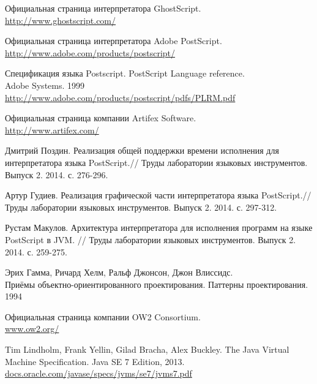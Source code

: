 \documentclass[14pt]{extarticle}
\begin{document}
	\begin{thebibliography}{99}
		Официальная страница интерпретатора GhostScript. \\
		\url{http://www.ghostscript.com/}
		
		Официальная страница интерпретатора Adobe PostScript. \\
		\url{http://www.adobe.com/products/postscript/}
		
		Спецификация языка Postscript. PostScript Language reference. \\
		Adobe Systems. 1999\\
		\url{http://www.adobe.com/products/postscript/pdfs/PLRM.pdf}
		
		Официальная страница компании Artifex Software. \\
		\url{	http://www.artifex.com/}

		Дмитрий Поздин. Реализация общей поддержки времени исполнения для интерпретатора языка PostScript.// Труды лаборатории языковых инструментов. Выпуск 2. 2014. с. 276-296.
		
		Артур Гудиев.
		Реализация графической части интерпретатора языка PostScript.// Труды лаборатории языковых инструментов. Выпуск 2. 2014. с. 297-312.

		Рустам Макулов.
		Архитектура интерпретатора для исполнения программ на языке PostScript в JVM. // Труды лаборатории языковых инструментов. Выпуск 2. 2014. с. 259-275.
		
		
		Эрих Гамма, Ричард Хелм, Ральф Джонсон, Джон Влиссидс. \\ Приёмы объектно-ориентированного проектирования. Паттерны проектирования.  1994

		Официальная страница компании OW2 Consortium. \\
		\url{www.ow2.org/}
				
		Tim Lindholm, Frank Yellin, Gilad Bracha, Alex Buckley.
		The Java Virtual Machine Specification.
		Java SE 7 Edition, 2013. \\
		\url{docs.oracle.com/javase/specs/jvms/se7/jvms7.pdf}
		



				

		
	\end{thebibliography}
	\pagebreak
	
	
\end{document}

